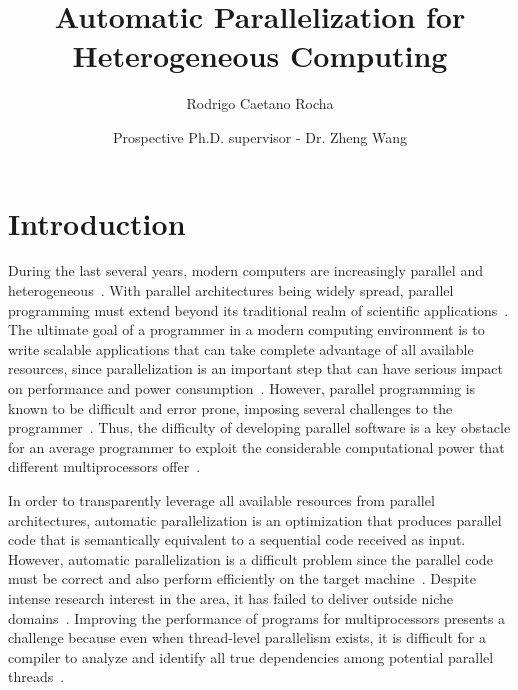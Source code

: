 \documentclass[a4paper,12pt]{article}
\title{\textbf{Automatic Parallelization for Heterogeneous Computing}}
\date{Prospective Ph.D. supervisor - Dr. Zheng Wang}
\author[]{Rodrigo Caetano Rocha}
\newcommand\FIXME[1]{\textcolor{red}{FIX:}\textcolor{red}{#1}}
\begin{document}
\maketitle

\begin{abstract}

\end{abstract}

\section{Introduction} 


During the last several years, modern computers are increasingly parallel and
heterogeneous~\cite{mohanty12,misailovic13}.  With parallel architectures being
widely spread, parallel programming must extend beyond its traditional realm of
scientific applications~\cite{li09}.  The ultimate goal of a programmer in a
modern computing environment is to write scalable applications that can take
complete advantage of all available resources, since parallelization is an
important step that can have serious impact on performance and power
consumption~\cite{cockx10}.  However, parallel programming is known to be
difficult and error prone, imposing several challenges to the
programmer~\cite{cockx10,mccool10,mccool12}.  Thus, the difficulty of
developing parallel software is a key obstacle for an average programmer to
exploit the considerable computational power that different multiprocessors
offer~\cite{misailovic13}.

In order to transparently leverage all available resources from parallel
architectures, automatic parallelization is an optimization that produces
parallel code that is semantically equivalent to a sequential code received as
input.  However, automatic parallelization is a difficult problem since the
parallel code must be correct and also perform efficiently on the target
machine~\cite{williams99}.  Despite intense research interest in the area, it
has failed to deliver outside niche domains~\cite{tournavitis09,wang14a}.
Improving the performance of programs for multiprocessors presents a challenge
because even when thread-level parallelism exists, it is difficult for a
compiler to analyze and identify all true dependencies among potential parallel
threads~\cite{hammond98}.
\end{document}
